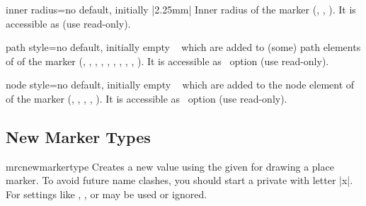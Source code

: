 \begin{docMrcKey}[marker]{inner radius}{=}{no default, initially |2.25mm|}
  Inner radius of the marker
  (, , ).
  It is accessible as  (use read-only).
\end{docMrcKey}

\begin{docMrcKey}[marker]{path style}{=}{no default, initially empty}
  \tikzname\  which are added to (some) path elements of
  of the marker
  (, , , ,
    , , , ,
    , ).
  It is accessible as \tikzname\ option  (use read-only).
\end{docMrcKey}

\begin{docMrcKey}[marker]{node style}{=}{no default, initially empty}
  \tikzname\  which are added to the node element of
  of the marker
  (, , , , ).
  It is accessible as \tikzname\ option  (use read-only).
\end{docMrcKey}



\subsection{New Marker Types}

\begin{docCommand}{mrcnewmarkertype}{}
  Creates a new  value  using the
  given  for drawing a place marker.
  To avoid future name clashes, you should start a private 
  with letter |x|. For  settings like
  ,
  , or  may be used
  or ignored.

  \begin{dispExample}
  \end{dispExample}
\end{docCommand}



